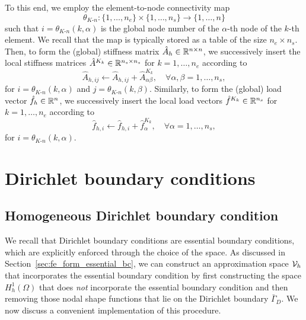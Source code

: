 To this end, we employ the element-to-node connectivity map
\begin{equation*}
  \theta_{K\text{-}n} : \{ 1, \dots, n_e\} \times \{ 1, \dots, n_s \} \to \{ 1,\dots,n \}
\end{equation*}
such that $i = \theta_{K\text{-}n}(k,\alpha)$ is the global node number of the $\alpha$-th node of the $k$-th element.  We recall that the map is typically stored as a table of the size $n_e \times n_s$.  Then, to form the (global) stiffness matrix $\hat A_h \in \mathbb{R}^{n \times n}$, we successively insert the local stiffness matrices $\hat A^{K_k} \in \mathbb{R}^{n_s \times n_s}$ for $k = 1,\dots,n_e$ according to
\begin{equation*}
  \hat A_{h,ij} \leftarrow \hat A_{h,ij} + \hat A^{K_k}_{\alpha\beta}, \quad \forall \alpha,\beta = 1,\dots,n_s,
\end{equation*}
for $i = \theta_{K\text{-}n}(k,\alpha)$ and $j = \theta_{K\text{-}n}(k,\beta)$. Similarly, to form the (global) load vector $\hat f_h \in \mathbb{R}^n$, we successively insert the local load vectors $\hat f^{K_k} \in \mathbb{R}^{n_s}$ for $k = 1,\dots,n_e$ according to
\begin{equation*}
  \hat f_{h,i} \leftarrow \hat f_{h,i} + \hat f^{K_k}_{\alpha}, \quad \forall \alpha = 1,\dots,n_s,
\end{equation*}
for $i = \theta_{K\text{-}n}(k,\alpha)$.

\section{Dirichlet boundary conditions}
\label{sec:fe_ess_bc}
\subsection{Homogeneous Dirichlet boundary condition}
We recall that Dirichlet boundary conditions are essential boundary conditions, which are explicitly enforced through the choice of the space.  As discussed in Section~\ref{sec:fe_form_essential_bc}, we can construct an approximation space $\mathcal{V}_h$ that incorporates the essential boundary condition by first constructing the space $H^1_h(\Omega)$ that does \emph{not} incorporate the essential boundary condition and then removing those nodal shape functions that lie on the Dirichlet boundary $\bar \Gamma_D$.  We now discuss a convenient implementation of this procedure.

